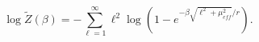 \begin{equation}
\log \widetilde{Z}\left(\beta \right)=-\sum _{\ell =1}^{\infty }\ell ^{2}\log \left(1-e^{-\beta \sqrt{\ell ^{2}+\mu _{eff}^{2}}/r}\right).\label{thermal pf}\end{equation}

